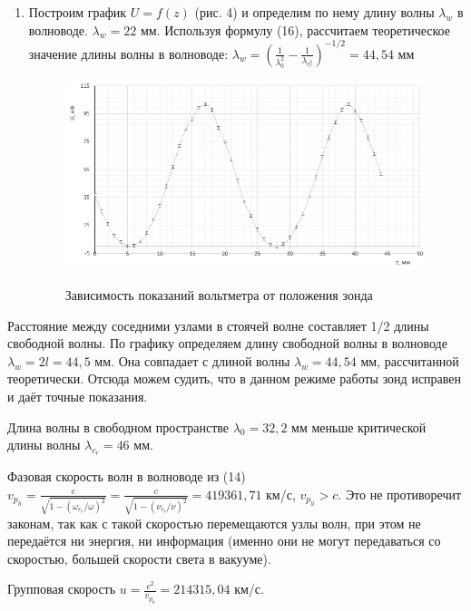 \documentclass[a4paper]{article}
\begin{document}
\begin{enumerate}
\begin{table}[h]
\end{table}
    
    \item Построим график $U = f(z)$ (рис. 4) и определим по нему длину волны $\lambda_w$ в волноводе. $\lambda_w = 22$ мм. Используя формулу (16), рассчитаем теоретическое значение длины волны в волноводе: $\lambda_w = (\frac{1}{\lambda_0^2}-\frac{1}{\lambda_c_r^2})^{-1/2} = 44,54$ мм
    
\begin{figure}[h]
    \centering
    \caption{Зависимость показаний вольтметра от положения зонда}
    \includegraphics[width=\textwidth]{graph1.PNG}
    \label{fig:vac}
\end{figure}
\end{enumerate}

 \item Расстояние между соседними узлами в стоячей волне составляет 1/2 длины свободной волны. По графику определяем длину свободной волны в волноводе $\lambda_w = 2l = 44,5$ мм. Она совпадает с длиной волны $\lambda_w = 44,54$ мм, рассчитанной теоретически. Отсюда можем судить, что в данном режиме работы зонд исправен и даёт точные показания. \par
 Длина волны в свободном пространстве $\lambda_0 = 32,2$ мм меньше критической длины волны $\lambda_c_r = 46$ мм. \par 
 Фазовая скорость волн в волноводе из (14) $v_p_h = \frac{c}{\sqrt{1 - (\omega_c_r/\omega)^2}} = \frac{c}{\sqrt{1 - (\nu_c_r/\nu)^2}} = 419361,71$ км/с, $v_p_h > c$. Это не противоречит законам, так как с такой скоростью перемещаются узлы волн, при этом не передаётся ни энергия, ни информация (именно они не могут передаваться со скоростью, большей скорости света в вакууме).  \par
 Групповая скорость $u = \frac{c^2}{v_p_h} = 214315,04$ км/с.
\end{document}
